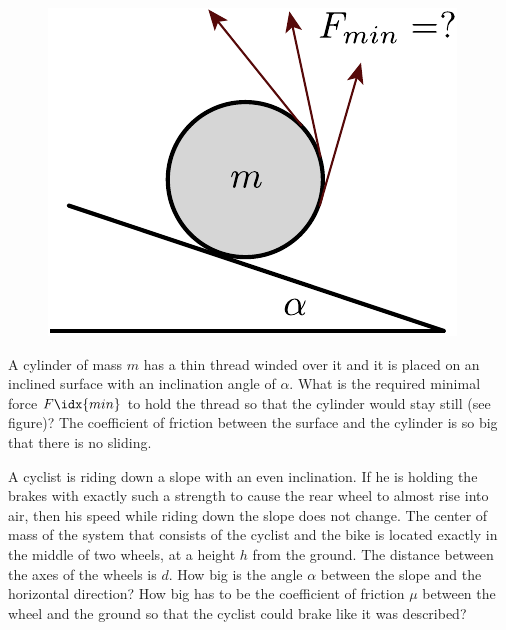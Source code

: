 \documentclass[11pt]{article}
\begin{document}

\probeng
\begin{figure}
\vspace{-15pt}
\includegraphics[width=\linewidth]{2013-lahg-08-joonis_niidirull-crop}
\end{figure}
A cylinder of mass $m$ has a thin thread winded over it and it is placed on an inclined surface with an inclination angle of $\alpha$. What is the required minimal force $F\idx{min}$ to hold the thread so that the cylinder would stay still (see figure)? The coefficient of friction between the surface and the cylinder is so big that there is no sliding.
\probend
\bigskip


\probeng
A cyclist is riding down a slope with an even inclination. If he is holding the brakes with exactly such a strength to cause the rear wheel to almost rise into air, then his speed while riding down the slope does not change. The center of mass of the system that consists of the cyclist and the bike is located exactly in the middle of two wheels, at a height $h$ from the ground. The distance between the axes of the wheels is $d$. How big is the angle $\alpha$ between the slope and the horizontal direction? How big has to be the coefficient of friction $\mu$ between the wheel and the ground so that the cyclist could brake like it was described?
\probend
\bigskip
\end{document}
